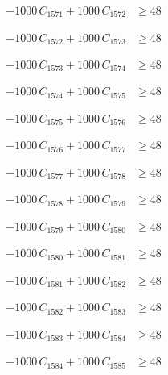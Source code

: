 \documentclass[a4paper,11pt]{article}
\begin{document}
\begin{align}
-1000\,C_{1571} + 1000\,C_{1572} &\geq 48 \nonumber
\end{align}

\begin{align}
-1000\,C_{1572} + 1000\,C_{1573} &\geq 48 \nonumber
\end{align}

\begin{align}
-1000\,C_{1573} + 1000\,C_{1574} &\geq 48 \nonumber
\end{align}

\begin{align}
-1000\,C_{1574} + 1000\,C_{1575} &\geq 48 \nonumber
\end{align}

\begin{align}
-1000\,C_{1575} + 1000\,C_{1576} &\geq 48 \nonumber
\end{align}

\begin{align}
-1000\,C_{1576} + 1000\,C_{1577} &\geq 48 \nonumber
\end{align}

\begin{align}
-1000\,C_{1577} + 1000\,C_{1578} &\geq 48 \nonumber
\end{align}

\begin{align}
-1000\,C_{1578} + 1000\,C_{1579} &\geq 48 \nonumber
\end{align}

\begin{align}
-1000\,C_{1579} + 1000\,C_{1580} &\geq 48 \nonumber
\end{align}

\begin{align}
-1000\,C_{1580} + 1000\,C_{1581} &\geq 48 \nonumber
\end{align}

\begin{align}
-1000\,C_{1581} + 1000\,C_{1582} &\geq 48 \nonumber
\end{align}

\begin{align}
-1000\,C_{1582} + 1000\,C_{1583} &\geq 48 \nonumber
\end{align}

\begin{align}
-1000\,C_{1583} + 1000\,C_{1584} &\geq 48 \nonumber
\end{align}

\begin{align}
-1000\,C_{1584} + 1000\,C_{1585} &\geq 48 \nonumber
\end{align}
\end{document}

